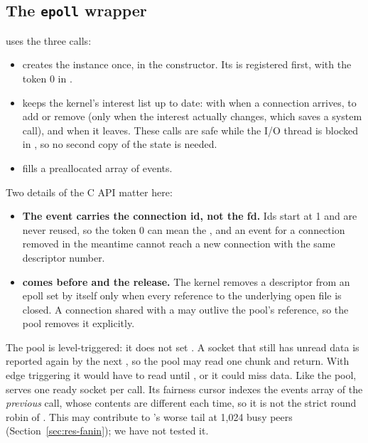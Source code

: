 \subsection{The \texttt{epoll} wrapper}

 uses the three  calls:
\begin{itemize}
  \item {} creates the instance once, in the
        constructor. Its  is registered first, with the token 0 in
        .
  \item {} keeps the kernel's interest list up to date:
         with  when a connection arrives,
         to add or remove  (only when the
        interest actually changes, which saves a system call), and
         when it leaves. These calls are safe while the I/O
        thread is blocked in , so no second copy of the state is
        needed.
  \item {} fills a preallocated array of 
        events.
\end{itemize}

Two details of the C API matter here:
\begin{itemize}
  \item \textbf{The event carries the connection id, not the fd.} Ids start at 1 and
        are never reused, so the token 0 can mean the , and an event
        for a connection removed in the meantime cannot reach a new connection with
        the same descriptor number.
  \item \textbf{ comes before  and the release.}
        The kernel removes a descriptor from an epoll set by itself only when every
        reference to the underlying open file is closed. A connection shared with a
         may outlive the pool's reference, so the pool removes it
        explicitly.
\end{itemize}

The pool is level-triggered: it does not set . A socket that still has
unread data is reported again by the next , so the pool may read
one chunk and return. With edge triggering it would have to read until
, or it could miss data. Like the  pool, 
serves one ready socket per call. Its fairness cursor indexes the events array of
the \emph{previous} call, whose contents are different each time, so it is not the
strict round robin of . This may contribute to 's worse
tail at 1,024 busy peers (Section~\ref{sec:res-fanin}); we have not tested it.

